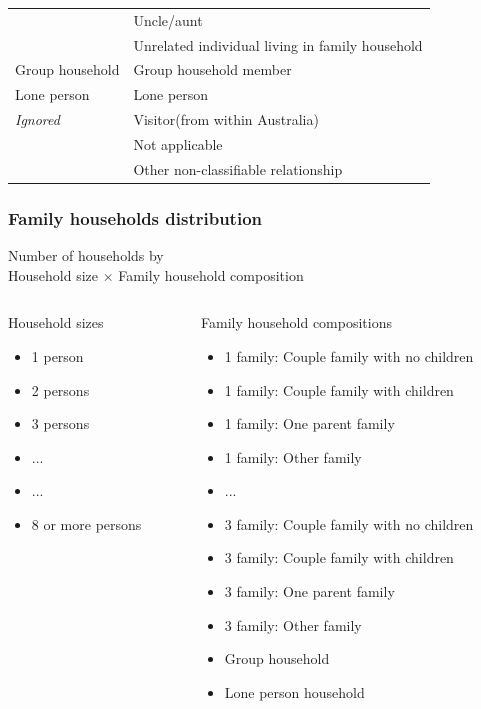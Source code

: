 \begin{frame}
{\begin{tabular}{|l|l|}
        &Uncle/aunt\\%
        &Unrelated individual living in family household\\%
        \hline%
        Group household& Group household member\\%
        \hline%
        Lone person & Lone person \\%
        \hline%
        \textit{Ignored}& Visitor(from within Australia)\\%
        &Not applicable\\%
        &Other non-classifiable relationship\\%
        \hline %
      \end{tabular}	%
    } %
\end{frame}
  
\begin{frame} \frametitle{Family households distribution} 
  {
    \small
    \begin{center} { 
        Number of households by\\ Household size $\times$ Family
          household composition} 
    \end{center}
      
    \begin{columns}[T] %
      \begin{column}{.3\textwidth} Household sizes {\small \begin{itemize}
              \item 1 person \item 2 persons \item 3 persons \item ... \item ...
              \item 8 or more persons \end{itemize} } \end{column}%
        \hfill%
        \begin{column}{.6\textwidth}
          
          Family household compositions
          
          \begin{itemize} \item 1 family: Couple family with no children \item
            1 family: Couple family with children \item 1 family: One parent
            family \item 1 family: Other family \item ... \item 3 family: Couple
            family with no children \item 3 family: Couple family with children
            \item 3 family: One parent family \item 3 family: Other family \item
            Group household \item Lone person household
            

\end{itemize}
\end{column}
\end{columns}}
\end{frame}
